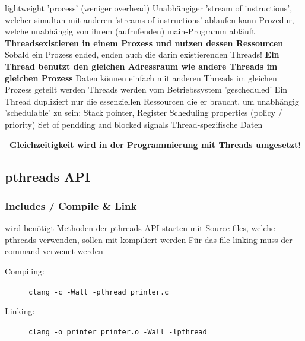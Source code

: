 \begin{outline}
    \1 lightweight 'process' (weniger overhead)
    \1 Unabhängiger 'stream of instructions', welcher simultan mit anderen 'streams of instructions' ablaufen kann %
    \1 Prozedur, welche unabhängig von ihrem (aufrufenden) main-Programm abläuft
    \1 \textbf{Threadsexistieren in einem Prozess und nutzen dessen Ressourcen}
        \2 Sobald ein Prozess ended, enden auch die darin existierenden Threads!
    \1 \textbf{Ein Thread benutzt den gleichen Adressraum wie andere Threads im gleichen Prozess}
        \2 Daten können einfach mit anderen Threads im gleichen Prozess geteilt werden
    \1 Threads werden vom Betriebssystem 'gescheduled'
    \1 Ein Thread dupliziert nur die essenziellen Ressourcen die er braucht, um unabhängig 'schedulable' zu sein:
        \2 Stack pointer, Register
        \2 Scheduling properties (policy / priority)
        \2 Set of pendding and blocked signals  %
        \2 Thread-spezifische Daten
\end{outline}

\vspace{0.1cm}

\textbf{ \textrightarrow\ Gleichzeitigkeit wird in der Programmierung mit Threads umgesetzt!}


\subsection{pthreads API}

\subsubsection{Includes / Compile \& Link}

\begin{outline}
    \1  wird benötigt
    \1 Methoden der pthreads API starten mit 
    \1 Source files, welche pthreads verwenden, sollen mit  kompiliert werden
    \1 Für das file-linking muss der command  verwenet werden
\end{outline}



\begin{description}
    \item[Compiling:] \lstinline|clang -c -Wall -pthread printer.c|
    \item[Linking:]   \lstinline|clang -o printer printer.o -Wall -lpthread|
\end{description}


